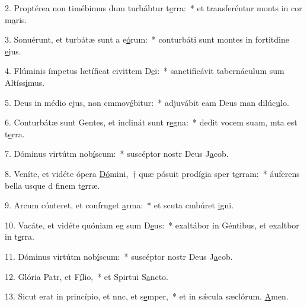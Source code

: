 2. Proptérea non timébimus dum turbábtur t\uline{e}rra:~* et transferéntur monts in cor m\uline{a}ris.\par 
3. Sonuérunt, et turbátæ sunt a e\uline{ó}rum:~* conturbáti sunt montes in fortitdine \uline{e}jus.\par 
4. Flúminis ímpetus lætíficat civittem D\uline{e}i:~* sanctificávit tabernáculum sum Altíss\uline{i}mus.\par 
5. Deus in médio ejus, non cmmov\uline{é}bitur:~* adjuvábit eam Deus man dilúc\uline{u}lo.\par 
6. Conturbátæ sunt Gentes, et inclinát sunt r\uline{e}gna:~* dedit vocem suam, mta est t\uline{e}rra.\par 
7. Dóminus virtútm nob\uline{í}scum:~* suscéptor nostr Deus J\uline{a}cob.\par 
8. Veníte, et vidéte ópera \uline{Dó}mini,~† quæ pósuit prodígia sper t\uline{e}rram:~* áuferens bella usque d finem t\uline{e}rræ.\par 
9. Arcum cónteret, et confrnget \uline{a}rma:~* et scuta cmbúret \uline{i}gni.\par 
10. Vacáte, et vidéte quóniam eg sum D\uline{e}us:~* exaltábor in Géntibus, et exaltbor in t\uline{e}rra.\par 
11. Dóminus virtútm nob\uline{í}scum:~* suscéptor nostr Deus J\uline{a}cob.\par 
12. Glória Patr, et F\uline{í}lio,~* et Spirtui S\uline{a}ncto.\par 
13. Sicut erat in princípio, et nnc, et s\uline{e}mper,~* et in sǽcula sæclórum. \uline{A}men.\par 
